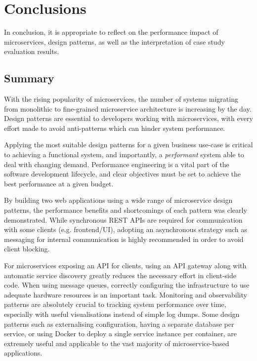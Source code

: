 \chapter{Conclusions}

In conclusion, it is appropriate to reflect on the performance impact of microservices, design patterns, as well as the interpretation of case study evaluation results.

\section{Summary}

With the rising popularity of microservices, the number of systems migrating from monolithic to fine-grained microservice architecture is increasing by the day. Design patterns are essential to developers working with microservices, with every effort made to avoid anti-patterns which can hinder system performance.

Applying the most suitable design patterns for a given business use-case is critical to achieving a functional system, and importantly, a \textit{performant} system able to deal with changing demand. Performance engineering is a vital part of the software development lifecycle, and clear objectives must be set to achieve the best performance at a given budget.

By building two web applications using a wide range of microservice design patterns, the performance benefits and shortcomings of each pattern was clearly demonstrated. While synchronous REST APIs are required for communication with some clients (e.g. frontend/UI), adopting an asynchronous strategy such as messaging for internal communication is highly recommended in order to avoid client blocking.

For microservices exposing an API for clients, using an API gateway along with automatic service discovery greatly reduces the necessary effort in client-side code. When using message queues, correctly configuring the infrastructure to use adequate hardware resources is an important task. Monitoring and observability patterns are absolutely crucial to tracking system performance over time, especially with useful visualisations instead of simple log dumps. Some design patterns such as externalising configuration, having a separate database per service, or using Docker to deploy a single service instance per container, are extremely useful and applicable to the vast majority of microservice-based applications.

